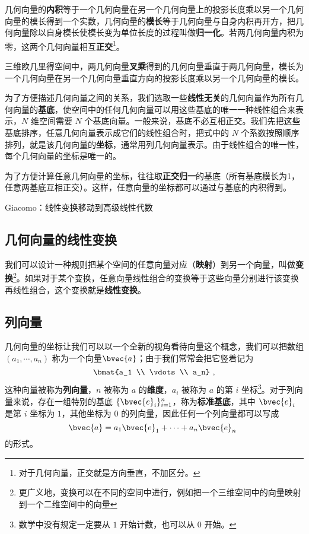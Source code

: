 几何向量的\textbf{内积}等于一个几何向量在另一个几何向量上的投影长度乘以另一个几何向量的模长得到一个实数，几何向量的\textbf{模长}等于几何向量与自身内积再开方，把几何向量除以自身模长使模长变为单位长度的过程叫做\textbf{归一化}。若两几何向量内积为零，这两个几何向量相互\textbf{正交}\footnote{对于几何向量，正交就是方向垂直，不加区分。}。

三维欧几里得空间中，两几何向量\textbf{叉乘}得到的几何向量垂直于两几何向量，模长为一个几何向量在另一个几何向量垂直方向的投影长度乘以另一个几何向量的模长。

为了方便描述几何向量之间的关系，我们选取一些\textbf{线性无关}的几何向量作为所有几何向量的\textbf{基底}，使空间中的任何几何向量可以用这些基底的唯一一种线性组合来表示，$N$ 维空间需要 $N$ 个基底向量。一般来说，基底不必互相正交。我们先把这些基底排序，任意几何向量表示成它们的线性组合时，把式中的 $N$ 个系数按照顺序排列，就是该几何向量的\textbf{坐标}，通常用列几何向量表示。由于线性组合的唯一性，每个几何向量的坐标是唯一的。

为了方便计算任意几何向量的坐标，往往取\textbf{正交归一}的基底（所有基底模长为1，任意两基底互相正交）。这样，任意向量的坐标都可以通过与基底的内积得到。


Giacomo：线性变换移动到高级线性代数
\subsection{几何向量的线性变换}

我们可以设计一种规则把某个空间的任意向量对应（\textbf{映射}）到另一个向量，叫做\textbf{变换}\footnote{更广义地，变换可以在不同的空间中进行，例如把一个三维空间中的向量映射到一个二维空间中的向量}。如果对于某个变换，任意向量线性组合的变换等于这些向量分别进行该变换再线性组合，这个变换就是\textbf{线性变换}。

\subsection{列向量}


几何向量的坐标让我们可以以一个全新的视角看待向量这个概念，我们可以把数组 $(a_1, \cdots, a_n)$ 称为一个向量$\bvec{a}$；由于我们常常会把它竖着记为
\begin{equation}
\bmat{a_1 \\ \vdots \\ a_n}~,
\end{equation}
这种向量被称为\textbf{列向量}，$n$ 被称为 $a$ 的\textbf{维度}，$a_i$ 被称为 $a$ 的第 $i$ 坐标\footnote{数学中没有规定一定要从 $1$ 开始计数，也可以从 $0$ 开始。}。对于列向量来说，存在一组特别的基底 $\{\bvec{e}_i\}_{i = 1}^n$，称为\textbf{标准基底}，其中 $\bvec{e}_i$ 是第 $i$ 坐标为 $1$，其他坐标为 $0$ 的列向量，因此任何一个列向量都可以写成
\begin{equation}
\bvec{a} = a_1 \bvec{e}_1 + \cdots + a_n \bvec{e}_n~
\end{equation}
的形式。

